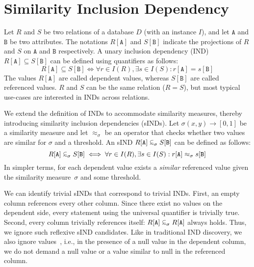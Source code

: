 \section{Similarity Inclusion Dependency}
\label{section:background}


Let $R$ and $S$ be two relations of a database $D$ (with an instance $I$), and let $\mathtt{A}$ and $\mathtt{B}$ be two attributes.
The notations $R[\mathtt{A}]$ and $S[\mathtt{B}]$ indicate the projections of $R$ and $S$ on $\mathtt{A}$ and $\mathtt{B}$ respectively.
A unary inclusion dependency (IND) $R[\mathtt{A}] \subseteq S[\mathtt{B}]$ can be defined using quantifiers as follows:
\begin{equation*}
    R[\mathtt{A}] \subseteq S[\mathtt{B}] \iff \forall r \in I(R), \exists s \in I(S): r[\mathtt{A}] = s[\mathtt{B}]
\end{equation*}
The values $R[\mathtt{A}]$ are called dependent values, whereas $S[\mathtt{B}]$ are called referenced values. $R$ and $S$ can be the same relation ($R=S$), but most typical use-cases are interested in INDs across relations.

We extend the definition of INDs to accommodate similarity measures, thereby introducing similarity inclusion dependencies (sINDs).
Let $\sigma(x,y) \rightarrow [0,1]$ be a similarity measure and let $\approx_\sigma$ be an operator that checks whether two values are similar for $\sigma$ and a threshold.
An sIND $R[\mathtt{A}] \simIND{\sigma} S[\mathtt{B}]$ can be defined as follows:
\begin{equation*}
    R[\mathtt{A}] \simIND{\sigma} S[\mathtt{B}] \iff \forall r \in I(R), \exists s \in I(S): r[\mathtt{A}] \approx_\sigma s[\mathtt{B}]
\end{equation*}
In simpler terms, for each dependent value exists a \emph{similar} referenced value given the similarity measure~$\sigma$ and some threshold.

We can identify trivial sINDs that correspond to trivial INDs.
First, an empty column references every other column.
Since there exist no values on the dependent side, every statement using the universal quantifier is trivially true.
Second, every column trivially references itself: $R[\mathtt{A}] \simIND{\sigma} R[\mathtt{A}]$ always holds.
Thus, we ignore such reflexive sIND candidates. 
Like in traditional IND discovery, we also ignore  values~\cite{papenbrock2015divide}, i.e., in the presence of a null value in the dependent column, we do not demand a null value or a value similar to null in the referenced column.

